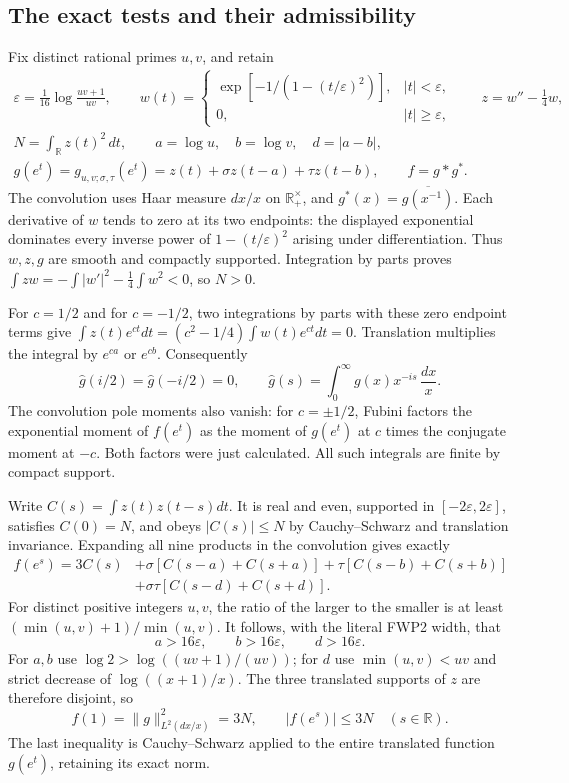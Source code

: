 \documentclass[11pt]{article}
\begin{document}
\subsection{The exact tests and their admissibility}

Fix distinct rational primes $u,v$, and retain
\[
\begin{gathered}
 \varepsilon=\frac1{16}\log\frac{uv+1}{uv},\qquad
 w(t)=\begin{cases}
 \exp[-1/(1-(t/\varepsilon)^2)],&|t|<\varepsilon,\\
 0,&|t|\ge\varepsilon,
 \end{cases}\qquad z=w''-\frac14w,\\
 N=\int_{\mathbb R}z(t)^2\,dt,\qquad
 a=\log u,\quad b=\log v,\quad d=|a-b|,\\
 g(e^t)=g_{u,v;\sigma,\tau}(e^t)
       =z(t)+\sigma z(t-a)+\tau z(t-b),
 \qquad f=g*g^*.
\end{gathered}
\tag{FWP2}
\]
The convolution uses Haar measure $dx/x$ on $\mathbb R_+^\times$,
and $g^*(x)=\overline{g(x^{-1})}$. Each derivative of $w$ tends
to zero at its two endpoints: the displayed exponential dominates
every inverse power of $1-(t/\varepsilon)^2$ arising under
differentiation. Thus $w,z,g$ are smooth and compactly supported.
Integration by parts proves
$\int zw=-\int|w'|^2-\tfrac14\int w^2<0$, so $N>0$.

For $c=1/2$ and for $c=-1/2$, two integrations by parts with these
zero endpoint terms give
$\int z(t)e^{ct}dt=(c^2-1/4)\int w(t)e^{ct}dt=0$.
Translation multiplies the integral by $e^{ca}$ or $e^{cb}$.
Consequently
\[
 \widehat g(i/2)=\widehat g(-i/2)=0,\qquad
 \widehat g(s)=\int_0^\infty g(x)x^{-is}\,\frac{dx}{x}.
 \tag{FWP3}
\]
The convolution pole moments also vanish: for $c=\pm1/2$, Fubini
factors the exponential moment of $f(e^t)$ as the moment of $g(e^t)$
at $c$ times the conjugate moment at $-c$. Both factors were just
calculated. All such integrals are finite by compact support.

Write $C(s)=\int z(t)z(t-s)dt$. It is real and even, supported in
$[-2\varepsilon,2\varepsilon]$, satisfies $C(0)=N$, and obeys
$|C(s)|\le N$ by Cauchy--Schwarz and translation invariance.
Expanding all nine products in the convolution gives exactly
\[
\begin{split}
 f(e^s)=3C(s)
  &+\sigma[C(s-a)+C(s+a)]
   +\tau[C(s-b)+C(s+b)]\\
  &+\sigma\tau[C(s-d)+C(s+d)].
\end{split}
\tag{FWP4}
\]
For distinct positive integers $u,v$, the ratio of the larger to the
smaller is at least $(\min(u,v)+1)/\min(u,v)$.
It follows, with the literal FWP2 width, that
\[
 a>16\varepsilon,\qquad b>16\varepsilon,
 \qquad d>16\varepsilon.
 \tag{FWP5}
\]
For $a,b$ use $\log2>\log((uv+1)/(uv))$; for $d$ use
$\min(u,v)<uv$ and strict decrease of $\log((x+1)/x)$.
The three translated supports of $z$ are therefore disjoint, so
\[
 f(1)=\|g\|_{L^2(dx/x)}^2=3N,
 \qquad |f(e^s)|\le3N\quad(s\in\mathbb R).
 \tag{FWP6}
\]
The last inequality is Cauchy--Schwarz applied to the entire
translated function $g(e^t)$, retaining its exact norm.
\end{document}
